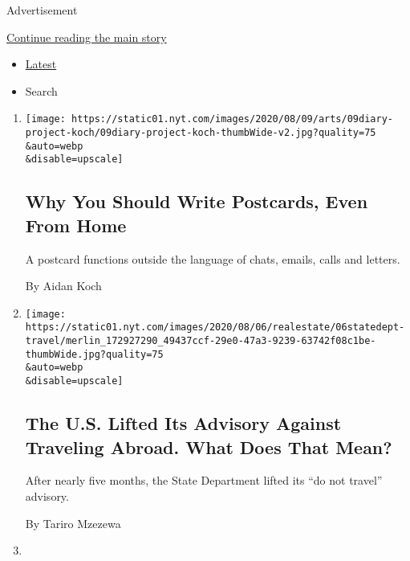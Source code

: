 Advertisement

\protect\hyperlink{after-mid2}{Continue reading the main story}

\begin{itemize}
\tightlist
\item
  \protect\hyperlink{stream-panel}{Latest}
\item
  Search
\end{itemize}

\begin{enumerate}
\def\labelenumi{\arabic{enumi}.}
\item
  \href{/2020/08/07/arts/aidan-koch-postcards.html}{}

  \texttt{[image: https://static01.nyt.com/images/2020/08/09/arts/09diary-project-koch/09diary-project-koch-thumbWide-v2.jpg?quality=75\\\&auto=webp\\\&disable=upscale]}

  \hypertarget{why-you-should-write-postcards-even-from-home}{%
  \subsection{Why You Should Write Postcards, Even From
  Home}\label{why-you-should-write-postcards-even-from-home}}

  A postcard functions outside the language of chats, emails, calls and
  letters.

  By Aidan Koch
\item
  \href{/2020/08/06/travel/USA-Travel-State-Department-warnings.html}{}

  \texttt{[image: https://static01.nyt.com/images/2020/08/06/realestate/06statedept-travel/merlin\_172927290\_49437ccf-29e0-47a3-9239-63742f08c1be-thumbWide.jpg?quality=75\\\&auto=webp\\\&disable=upscale]}

  \hypertarget{the-us-lifted-its-advisory-against-traveling-abroad-what-does-that-mean}{%
  \subsection{The U.S. Lifted Its Advisory Against Traveling Abroad.
  What Does That
  Mean?}\label{the-us-lifted-its-advisory-against-traveling-abroad-what-does-that-mean}}

  After nearly five months, the State Department lifted its ``do not
  travel'' advisory.

  By Tariro Mzezewa
\item
  \href{/2020/08/06/arts/design/suffragist-19th-amendment-central-park.html}{}


\end{enumerate}
